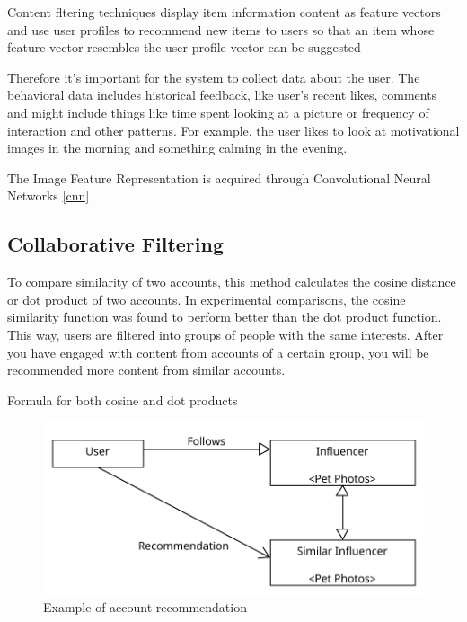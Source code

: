 Content fltering techniques display item information content as feature vectors and use user profiles to recommend new items to users so that an item whose feature vector resembles the user profile vector can be suggested \cite{esvdascfacsasdicars}

Therefore it's important for the system to collect data about the user. The behavioral data includes historical feedback, like user's recent likes, comments and might include things like time spent looking at a picture or frequency of interaction and other patterns. For example, the user likes to look at motivational images in the morning and something calming in the evening.

The Image Feature Representation is acquired through Convolutional Neural Networks \ref{cnn}

\subsection{Collaborative Filtering}\label{applications/collaborative-filtering}

To compare similarity of two accounts, this method calculates the cosine distance or dot product of two accounts. \cite{ig-explore} In experimental comparisons, the cosine similarity function was found to perform better than the dot product function. \cite{10408929} This way, users are filtered into groups of people with the same interests. After you have engaged with content from accounts of a certain group, you will be recommended more content from similar accounts. 

\begin{comen}
    Formula for both cosine and dot products   
\end{comen}

\begin{figure}[H]
    \centering
    \includegraphics[width=1\linewidth]{Diagrams/collaborative-filtering.pdf}
    \caption{Example of account recommendation}
    \label{fig:collaborative-filtering-diagram}
\end{figure}
